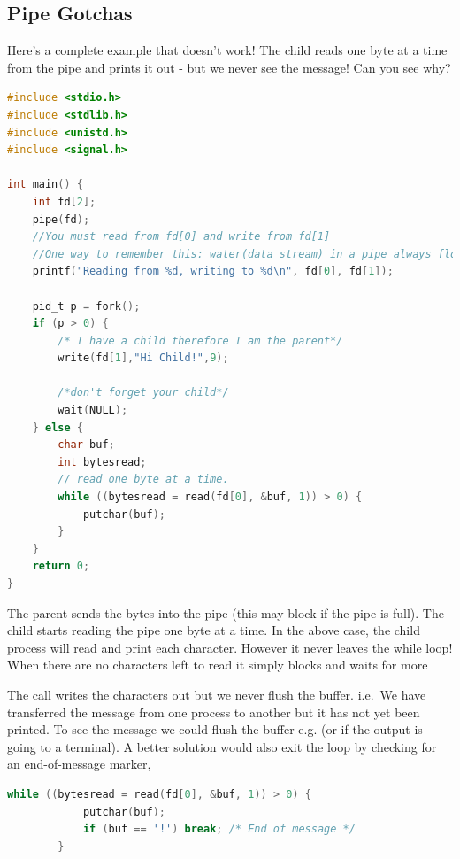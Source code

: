 \subsection{Pipe Gotchas}\label{pipe-gotchas}

Here's a complete example that doesn't work! The child reads one byte at a time from the pipe and prints it out - but we never see the message! Can you see why?

\begin{lstlisting}[language=C]
#include <stdio.h>
#include <stdlib.h>
#include <unistd.h>
#include <signal.h>

int main() {
    int fd[2];
    pipe(fd);
    //You must read from fd[0] and write from fd[1]
    //One way to remember this: water(data stream) in a pipe always flows from a higher place(1) to a lower place(0)
    printf("Reading from %d, writing to %d\n", fd[0], fd[1]);

    pid_t p = fork();
    if (p > 0) {
        /* I have a child therefore I am the parent*/
        write(fd[1],"Hi Child!",9);

        /*don't forget your child*/
        wait(NULL);
    } else {
        char buf;
        int bytesread;
        // read one byte at a time.
        while ((bytesread = read(fd[0], &buf, 1)) > 0) {
            putchar(buf);
        }
    }
    return 0;
}
\end{lstlisting}

The parent sends the bytes  into the pipe (this may block if the pipe is full). The child starts reading the pipe one byte at a time. In the above case, the child process will read and print each character. However it never leaves the while loop! When there are no characters left to read it simply blocks and waits for more 

The call  writes the characters out but we never flush the  buffer. i.e.~We have transferred the message from one process to another but it has not yet been printed. To see the message we could flush the buffer e.g.  (or  if the output is going to a terminal). A better solution would also exit the loop by checking for an end-of-message marker,

\begin{lstlisting}[language=C]
        while ((bytesread = read(fd[0], &buf, 1)) > 0) {
            putchar(buf);
            if (buf == '!') break; /* End of message */
        }
\end{lstlisting}

